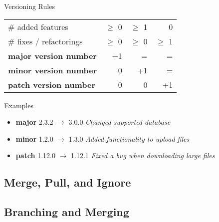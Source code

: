 \begin{frame}{\insertsubsection}
\begin{fancycolumns}[b]
\begin{note}{Versioning Rules }
\begin{table}
\begin{tabular}{lrrr}
					\#{} added features  & $\geq$ 0 & $\geq$ 1 & 0 \\
					\#{} fixes / refactorings  & $\geq$ 0  & $\geq$ 0  & $\geq$ 1 \\
					\midrule
					\textbf{major version number} & +1 & = & = \\
					\textbf{minor version number} & 0 & +1 & = \\
					\textbf{patch version number} & 0 & 0 & +1 \\
					\bottomrule
				\end{tabular}
			\end{table}
		\end{note}
		\begin{example}{Examples}
			\begin{itemize}
				\item \textbf{major} 2.3.2 $\rightarrow$ 3.0.0
				\textit{Changed supported database}
				\item \textbf{minor} 1.2.0 $\rightarrow$ 1.3.0
				\textit{Added functionality to upload files}
				\item \textbf{patch} 1.12.0 $\rightarrow$ 1.12.1
				\textit{Fixed a bug when downloading large files}
			\end{itemize}
		\end{example}
	\end{fancycolumns}
\end{frame}


\subsection{Merge, Pull, and Ignore}
\slideMergePull

\slideIgnore

\subsection{Branching and Merging}
\begin{frame}{\insertsubsection}
	\slideBranchingAndMerging
\end{frame}

